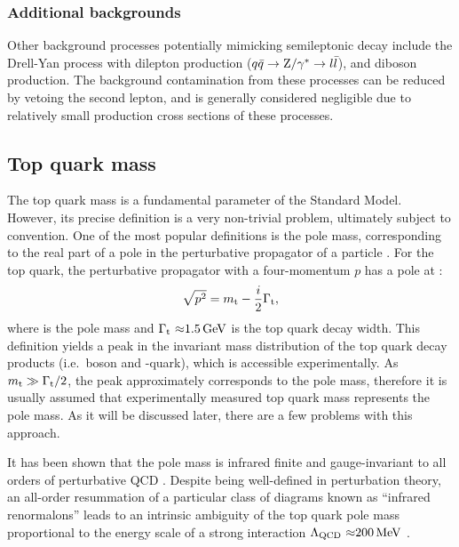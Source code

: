 \subsubsection*{Additional backgrounds}
Other background processes potentially mimicking semileptonic \ttbar decay include the Drell-Yan process with dilepton
production ($q \bar{q} \rightarrow \mathrm{Z}/\gamma^* \rightarrow l \bar{l}$), and diboson production. The background
contamination from these processes can be reduced by vetoing the second lepton, and is generally considered negligible
due to relatively small production cross sections of these processes.


\subsection{Top quark mass}
\label{ss:top_mass}
The top quark mass is a fundamental parameter of the Standard Model. However, its precise definition is a very
non-trivial problem, ultimately subject to convention. One of the most popular definitions is the pole mass,
corresponding to the real part of a pole in the perturbative propagator of a particle
\autocite{pole_mass_in_QCD_Tarrach}. For the top quark, the perturbative propagator with a four-momentum $p$ has a pole
at \autocite{top_pole_mass}:
\begin{equation}
\sqrt{p^2} = m_\mathrm{t} - \frac{i}{2} \Gamma_\textrm{t},
\end{equation}
where \mtop is the pole mass and $\Gamma_\textrm{t}~\SI{\approx1.5}{\GeV}$ is the top quark decay width. This definition
yields a peak in the invariant mass distribution of the top quark decay products (i.e.\ \W boson and \cPqb-quark), which
is accessible experimentally. As $m_\mathrm{t} \gg \Gamma_\textrm{t}/2$, the peak approximately corresponds to the pole mass,
therefore it is usually assumed that experimentally measured top quark mass represents the pole mass. As it will be
discussed later, there are a few problems with this approach.

It has been shown that the pole mass is infrared finite and gauge-invariant to all orders of perturbative QCD
\autocite{pole_mass_in_QCD_Kronfeld}. Despite being well-defined in perturbation theory, an all-order resummation of a
particular class of diagrams known as ``infrared renormalons'' \autocite{renormalons1, renormalons2} leads to an
intrinsic ambiguity of the top quark pole mass proportional to the energy scale of a strong interaction
$\Lambda_\textrm{QCD}~\SI{\approx200}{\MeV}$ \autocite{pole_MS_top_difference}.

